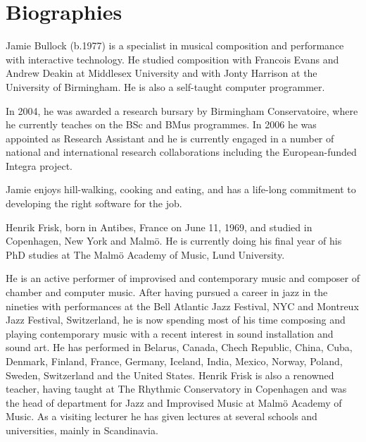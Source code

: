 \documentclass[10pt,journal,final]{IEEEtran}
\begin{document}
\section{Biographies}
\label{sec:biographies}
\flushbottom
\begin{biography}
Jamie Bullock (b.1977) is a specialist in musical composition and
performance with interactive technology. He studied composition with
Francois Evans and Andrew Deakin at Middlesex University and with Jonty
Harrison at the University of Birmingham. He is also a self-taught
computer programmer.

In 2004, he was awarded a research bursary by Birmingham Conservatoire,
where he currently teaches on the BSc and BMus programmes. In 2006 he
was appointed as Research Assistant and he is currently engaged in a
number of national and international research collaborations including
the European-funded Integra project.

Jamie enjoys hill-walking, cooking and eating, and has a life-long
commitment to developing the right software for the job.
\end{biography}
\begin{biography}
Henrik Frisk, born in Antibes, France on June 11, 1969, and studied in Copenhagen, New York and Malm\"{o}. He is currently doing his final year of his PhD studies at The Malm\"{o} Academy of Music, Lund University. 

He is an active performer of improvised and contemporary music and composer of chamber and computer music. After having pursued a career in jazz in the nineties with performances at the Bell Atlantic Jazz Festival, NYC and Montreux Jazz Festival, Switzerland, he is now spending most of his time composing and playing contemporary music with a recent interest in sound installation and sound art. He has performed in Belarus, Canada, Chech Republic, China, Cuba, Denmark, Finland, France, Germany, Iceland, India, Mexico, Norway, Poland, Sweden, Switzerland and the United States. Henrik Frisk is also a renowned teacher, having taught at The Rhythmic Conservatory in Copenhagen and was the head of department for Jazz and Improvised Music at Malmö Academy of Music. As a visiting lecturer he has given lectures at several schools and universities, mainly in Scandinavia.
\end{biography}
\end{document}
